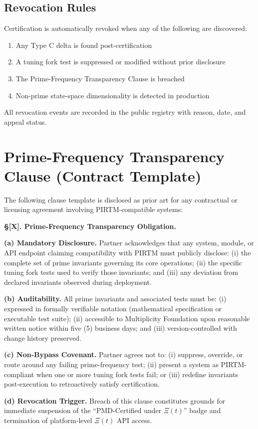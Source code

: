 \documentclass[12pt,letterpaper]{article}
\theoremstyle{definition}
\theoremstyle{remark}
\begin{document}
\subsection{Revocation Rules}

Certification is automatically revoked when any of the following are discovered:
\begin{enumerate}[noitemsep]
\item Any Type C delta is found post-certification
\item A tuning fork test is suppressed or modified without prior disclosure
\item The Prime-Frequency Transparency Clause is breached
\item Non-prime state-space dimensionality is detected in production
\end{enumerate}
All revocation events are recorded in the public registry with reason, date, and appeal status.

\section{Prime-Frequency Transparency Clause (Contract Template)}

The following clause template is disclosed as prior art for any contractual or licensing agreement involving PIRTM-compatible systems:

\begin{mdframed}[backgroundcolor=codeback,linecolor=codegray,linewidth=0.6pt]
\textbf{\S[X]. Prime-Frequency Transparency Obligation.}

\textbf{(a) Mandatory Disclosure.} Partner acknowledges that any system, module, or API endpoint claiming compatibility with PIRTM must publicly disclose: (i) the complete set of prime invariants governing its core operations; (ii) the specific tuning fork tests used to verify those invariants; and (iii) any deviation from declared invariants observed during deployment.

\textbf{(b) Auditability.} All prime invariants and associated tests must be: (i) expressed in formally verifiable notation (mathematical specification or executable test suite); (ii) accessible to Multiplicity Foundation upon reasonable written notice within five (5) business days; and (iii) version-controlled with change history preserved.

\textbf{(c) Non-Bypass Covenant.} Partner agrees not to: (i) suppress, override, or route around any failing prime-frequency test; (ii) present a system as PIRTM-compliant when one or more tuning fork tests fail; or (iii) redefine invariants post-execution to retroactively satisfy certification.

\textbf{(d) Revocation Trigger.} Breach of this clause constitutes grounds for immediate suspension of the ``PMD-Certified under $\Xi(t)$'' badge and termination of platform-level $\Xi(t)$ API access.
\end{mdframed}
\end{document}

